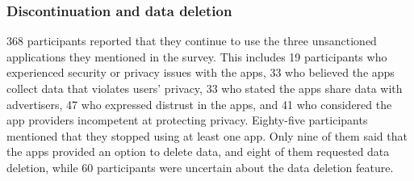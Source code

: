 \subsubsection{Discontinuation and data deletion}
\label{discontinue_data_deletion}
$368$ participants reported that they continue to use the three unsanctioned applications they mentioned in the survey. 
This includes 19 participants who experienced security or privacy issues with the apps, 33 who believed the apps collect data that violates users' privacy, 33 who stated the apps share data with advertisers, 47 who expressed distrust in the apps, and 41 who considered the app providers incompetent at protecting privacy.
%
Eighty-five participants mentioned that they stopped using at least one app.
Only nine of them said that the apps provided an option to delete data, and eight of them requested data deletion, while 60 participants were uncertain about the data deletion feature.






